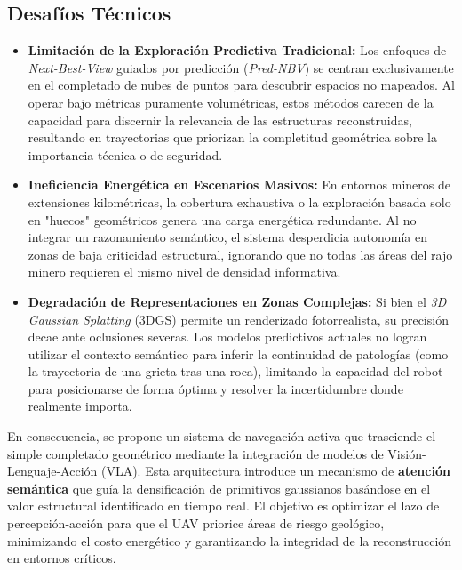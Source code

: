 \documentclass[12pt,a4paper]{article}
\begin{document}
	\subsection{Desafíos Técnicos}
	\begin{itemize}
		\item \textbf{Limitación de la Exploración Predictiva Tradicional:} Los enfoques de \textit{Next-Best-View} guiados por predicción (\textit{Pred-NBV}) se centran exclusivamente en el completado de nubes de puntos para descubrir espacios no mapeados. Al operar bajo métricas puramente volumétricas, estos métodos carecen de la capacidad para discernir la relevancia de las estructuras reconstruidas, resultando en trayectorias que priorizan la completitud geométrica sobre la importancia técnica o de seguridad.
		
		\item \textbf{Ineficiencia Energética en Escenarios Masivos:} En entornos mineros de extensiones kilométricas, la cobertura exhaustiva o la exploración basada solo en "huecos" geométricos genera una carga energética redundante. Al no integrar un razonamiento semántico, el sistema desperdicia autonomía en zonas de baja criticidad estructural, ignorando que no todas las áreas del rajo minero requieren el mismo nivel de densidad informativa.
		
		\item \textbf{Degradación de Representaciones en Zonas Complejas:} Si bien el \textit{3D Gaussian Splatting} (3DGS) permite un renderizado fotorrealista, su precisión decae ante oclusiones severas. Los modelos predictivos actuales no logran utilizar el contexto semántico para inferir la continuidad de patologías (como la trayectoria de una grieta tras una roca), limitando la capacidad del robot para posicionarse de forma óptima y resolver la incertidumbre donde realmente importa.
	\end{itemize}
	
	En consecuencia, se propone un sistema de navegación activa que trasciende el simple completado geométrico mediante la integración de modelos de Visión-Lenguaje-Acción (VLA). Esta arquitectura introduce un mecanismo de \textbf{atención semántica} que guía la densificación de primitivos gaussianos basándose en el valor estructural identificado en tiempo real. El objetivo es optimizar el lazo de percepción-acción para que el UAV priorice áreas de riesgo geológico, minimizando el costo energético y garantizando la integridad de la reconstrucción en entornos críticos.
	
\end{document}
